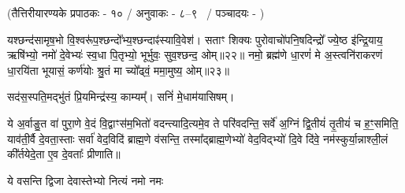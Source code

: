 {}
\newcommand{\anuvakamend}{\refstepcounter{anuvakam}\\[-0.8ex]
\rule[0.5ex]{0.93\textwidth}{1.5pt}\bfseries{[\devanumber{\arabic{anuvakam}}]}%
}
\newcommand{\ta}[3]{
\centerline{\scriptsize (तैत्तिरीयारण्यके प्रपाठकः - #1 / अनुवाकः - #2\ifx\hfuzz#3\hfuzz%
%
\else
\mbox{ }/ पञ्चादयः - #3%
\fi%
)}
}
\newcommand{\tb}[4]{
\centerline{\scriptsize (तैत्तिरीयब्राह्मणे अष्टकम् - #1 / प्रपाठकः - #2 / अनुवाकः - #3\ifx\hfuzz#4\hfuzz%
%
\else
\mbox{ }/ पञ्चादयः - #4%
\fi%
)}
}
\newcommand{\ts}[4]{
\centerline{\scriptsize (तैत्तिरीयसंहितायां काण्डम् - #1 / प्रपाठकः - #2 / अनुवाकः - #3\ifx\hfuzz#4\hfuzz%
%
\else
\mbox{ }/ पञ्चादयः – #4%
\fi%
)}
}
\setlength{\emergencystretch}{3em}

\clearpage

\clearpage
 
\clearpage
 
\closesection

\clearpage
 
\clearpage
 
\clearpage
{}
\ta{१०}{८–९}{}

यश्छन्द॑सामृष॒भो वि॒श्वरू॑प॒श्छन्दो᳚भ्य॒श्छन्दाꣴ॑स्यावि॒वेश॑। सताꣳ शिक्यः पुरोवाचो॑पनि॒षदिन्द्रो᳚ ज्ये॒ष्ठ इ॑न्द्रि॒याय॒ ऋषि॑भ्यो॒ नमो॑ दे॒वेभ्यः॑ स्व॒धा पि॒तृभ्यो॒ भूर्भुवः॒ सुव॒श्छन्द॒ ओम्॥२२॥ नमो॒ ब्रह्म॑णे धा॒रणं॑ मे अ॒स्त्वनि॑राकरणं धा॒रयि॑ता भूयासं॒ कर्ण॑योः श्रु॒तं मा च्यो᳚ढ्वं॒ ममा॒मुष्य॒ ओम्॥२३॥

सद॑स॒स्पति॒मद्भु॑तं प्रि॒यमिन्द्र॑स्य॒ काम्यम्᳚। सनिं॑ मे॒धाम॑यासिषम्।
\closesection

ये अ॒र्वाङु॒त वा॑ पुरा॒णे वे॒दं वि॒द्वाꣳस॑म॒भितो॑ वदन्त्यादि॒त्यमे॒व ते परि॑वदन्ति॒ सर्वे॑ अ॒ग्निं द्वि॒तीयं॑ तृ॒तीयं॑ च ह॒ꣳ॒समिति॒ याव॑ती॒र्वै दे॒वता॒स्ताः सर्वा॑ वेद॒विदि॑ ब्राह्म॒णे व॑सन्ति॒ तस्मा᳚द्ब्राह्म॒णेभ्यो॑ वेद॒विद्भ्यो॑ दि॒वे दि॑वे॒ नम॑स्कुर्या॒न्नाश्ली॒लं की᳚र्तयेदे॒ता ए॒व दे॒वताः᳚ प्रीणाति॥

{ये वसन्ति द्विजा देवास्तेभ्यो नित्यं नमो नमः}

